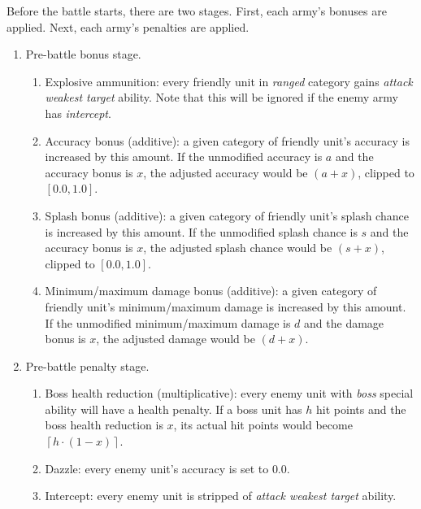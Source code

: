\documentclass{article}
\newcommand{\ceil}[1]{\left\lceil #1 \right\rceil}
\numberwithin{equation}{section}
\begin{document}
Before the battle starts, there are two stages. First, each army's bonuses are applied. Next, each army's penalties are applied.
\begin{enumerate}
    \item Pre-battle bonus stage.
    \begin{enumerate}
        \item Explosive ammunition: every friendly unit in \emph{ranged} category gains \emph{attack weakest target} ability. Note that this will be ignored if the enemy army has \emph{intercept}.
        \item Accuracy bonus (additive): a given category of friendly unit's accuracy is increased by this amount. If the unmodified accuracy is $a$ and the accuracy bonus is $x$, the adjusted accuracy would be $(a + x)$, clipped to $[0.0, 1.0]$.
        \item Splash bonus (additive): a given category of friendly unit's splash chance is increased by this amount. If the unmodified splash chance is $s$ and the accuracy bonus is $x$, the adjusted splash chance would be $(s + x)$, clipped to $[0.0, 1.0]$.
        \item Minimum/maximum damage bonus (additive): a given category of friendly unit's minimum/maximum damage is increased by this amount. If the unmodified minimum/maximum damage is $d$ and the damage bonus is $x$, the adjusted damage would be $(d + x)$.
    \end{enumerate}
    \item Pre-battle penalty stage.
    \begin{enumerate}
        \item Boss health reduction (multiplicative): every enemy unit with \emph{boss} special ability will have a health penalty. If a boss unit has $h$ hit points and the boss health reduction is $x$, its actual hit points would become $\ceil{h \cdot (1 - x)}$.
        \item Dazzle: every enemy unit's accuracy is set to $0.0$.
        \item Intercept: every enemy unit is stripped of \emph{attack weakest target} ability.
    \end{enumerate}
\end{enumerate}
\end{document}
